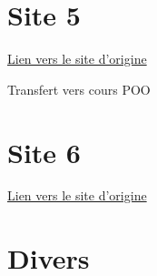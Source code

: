 \documentclass[12pt,a4paper]{exam}%
\begin{document}
\section{Site 5}
\href{https://pynative.com/python-object-oriented-programming-oop-exercise/#h-oop-exercise-1-create-a-class-with-instance-attributes}{Lien vers le site d'origine}\par
Transfert vers cours POO
%	
%	
\section{Site 6}
\href{https://github.com/karan/Projects-Solutions}{Lien vers le site d'origine}\par
\begin{questions}
	
	
	
\end{questions}
\section{Divers}
\begin{questions}
	
	
	
\end{questions}
\end{document}
